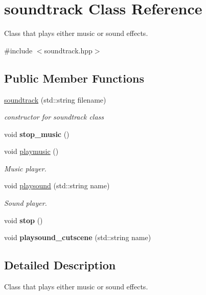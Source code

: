 \hypertarget{classsoundtrack}{}\section{soundtrack Class Reference}
\label{classsoundtrack}


Class that plays either music or sound effects.  




{\ttfamily \#include $<$soundtrack.\+hpp$>$}

\subsection*{Public Member Functions}
\begin{DoxyCompactItemize}
\item 
\hyperlink{classsoundtrack_add31bdeb1a693d541443f1d88586d3b6}{soundtrack} (std\+::string filename)
\begin{DoxyCompactList}\small\item\em constructor for soundtrack class \end{DoxyCompactList}\item 
\mbox{\label{classsoundtrack_a9f25fee4c6d5dbc820e2a18b13b43e68}} 
void {\bfseries stop\+\_\+music} ()
\item 
void \hyperlink{classsoundtrack_a7569a4c0cde86548197756b8e05cf464}{playmusic} ()
\begin{DoxyCompactList}\small\item\em Music player. \end{DoxyCompactList}\item 
void \hyperlink{classsoundtrack_aa18de6469aca15922cfa8a8e8412f76d}{playsound} (std\+::string name)
\begin{DoxyCompactList}\small\item\em Sound player. \end{DoxyCompactList}\item 
\mbox{\label{classsoundtrack_a9047bea4f37493cbe81a990bc9d0c4e7}} 
void {\bfseries stop} ()
\item 
\mbox{\label{classsoundtrack_a83744518feb748a979a67a56fae997fe}} 
void {\bfseries playsound\+\_\+cutscene} (std\+::string name)
\end{DoxyCompactItemize}


\subsection{Detailed Description}
Class that plays either music or sound effects. 

